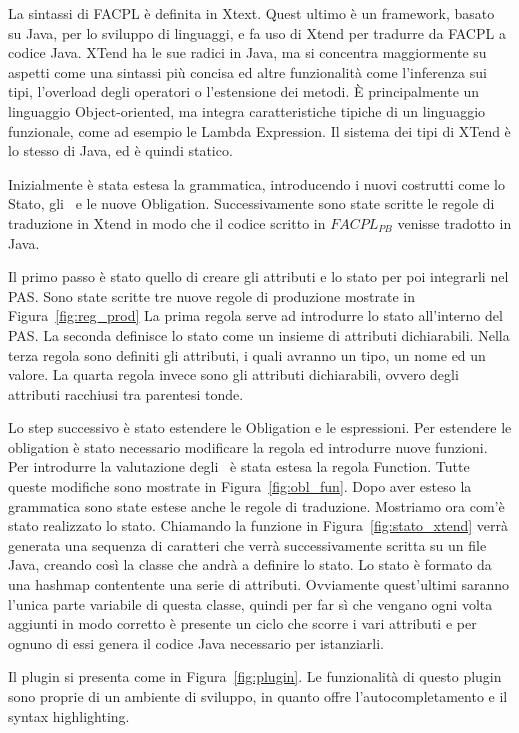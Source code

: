 La sintassi di \ac{FACPL} è definita in Xtext. Quest ultimo è un framework, basato su Java, per lo sviluppo di linguaggi, e fa uso di Xtend per tradurre da \ac{FACPL} a codice Java.
XTend ha le sue radici in Java, ma si concentra maggiormente su aspetti come una sintassi più concisa ed altre funzionalità come l'inferenza sui tipi, l'overload degli operatori o l'estensione dei metodi. 
È principalmente un linguaggio Object-oriented, ma integra caratteristiche tipiche di un linguaggio funzionale, come ad esempio le Lambda Expression. Il sistema dei tipi di XTend è lo stesso di Java, ed è quindi statico.\par
Inizialmente è stata estesa la grammatica, introducendo i nuovi costrutti come lo Stato, gli \statusattribute \ e le nuove Obligation.
Successivamente sono state scritte le regole di traduzione in Xtend in modo che il codice scritto in $FACPL_{PB}$ venisse tradotto in Java.\par
Il primo passo è stato quello di creare gli attributi e lo stato per poi integrarli nel PAS.
Sono state scritte tre nuove regole di produzione mostrate in Figura~\ref{fig:reg_prod}
La prima regola serve ad introdurre lo stato all'interno del PAS.
La seconda definisce lo stato come un insieme di attributi dichiarabili.
Nella terza regola sono definiti gli attributi, i quali avranno un tipo, un nome ed un valore.
La quarta regola invece sono gli attributi dichiarabili, ovvero degli attributi racchiusi tra parentesi tonde.\par
Lo step successivo è stato estendere le Obligation e le espressioni.
Per estendere le obligation è stato necessario modificare la regola ed introdurre nuove funzioni. Per introdurre la valutazione degli \statusattribute \ è stata estesa la regola Function. Tutte queste modifiche sono mostrate in Figura~\ref{fig:obl_fun}.
Dopo aver esteso la grammatica sono state estese anche le regole di traduzione. Mostriamo ora com'è stato realizzato lo stato.
Chiamando la funzione in Figura~\ref{fig:stato_xtend} verrà generata una sequenza di caratteri che verrà successivamente scritta su un file Java, creando così la classe che andrà a definire lo stato.
Lo stato è formato da una hashmap contentente una serie di attributi. Ovviamente quest'ultimi saranno l'unica parte variabile di questa classe, quindi per far sì che vengano ogni volta aggiunti in modo corretto è presente un ciclo che scorre i vari attributi e per ognuno di essi genera il codice Java necessario per istanziarli. \par
Il plugin si presenta come in Figura~\ref{fig:plugin}. Le funzionalità di questo plugin sono proprie di un ambiente di sviluppo, in quanto offre l'autocompletamento e il syntax highlighting. 



